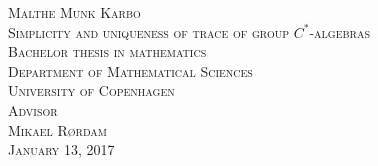 \clearpage
\thispagestyle{empty}

\begin{titlingpage}
	\vspace*{5.5cm}
	\noindent
	{\large\textsc{Malthe Munk Karbo}}\\[0.5cm]
	{\large\textsc{Simplicity and uniqueness of trace of group $C^*$-algebras}}\\[0.1cm]
	\vfill\noindent
	{\large\textsc{Bachelor thesis in mathematics}}\\[0.2cm]
	\noindent
	{\large\textsc{Department of Mathematical Sciences}}\\[0.2cm]
	\noindent
	{\large\textsc{University of Copenhagen}}\\[1cm]
	{\large\textsc{Advisor \\[0.2cm] {\Large Mikael Rørdam }}}\\[1cm]
	{\large\textsc{January 13, 2017}}
	\let\cleardoublepage\clearpage
\end{titlingpage}
\normalfont
\restoregeometry
\cleardoublepage
